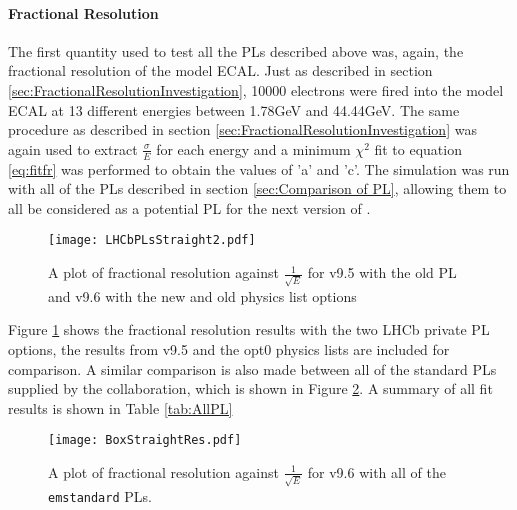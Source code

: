 \paragraph{Fractional Resolution}
The first quantity used to test all the PLs described above was, again, the fractional resolution of the model ECAL.  Just as described in section \ref{sec:FractionalResolutionInvestigation}, 10000 electrons were fired into the model ECAL at 13 different energies between 1.78GeV and 44.44GeV.  The same procedure as described in section \ref{sec:FractionalResolutionInvestigation} was again used to extract $\frac{\sigma}{E}$ for each energy and a minimum $\chi^2$ fit to equation \ref{eq:fitfr} was performed to obtain the values of 'a' and 'c'.  The simulation was run with all of the PLs described in section \ref{sec:Comparison of PL}, allowing them to all be considered as a potential PL for the next version of \gauss.
\begin{figure}[h]
  \centering
  \texttt{[image: LHCbPLsStraight2.pdf]}
  \caption{A plot of fractional resolution against $\frac{1}{\sqrt{E}}$ for \geant v9.5 with the old PL and v9.6 with the new and old physics list options}
  \label{fig:LHCbPLStraightFR}
\end{figure}

Figure \ref{fig:LHCbPLStraightFR} shows the fractional resolution results with the two LHCb private PL options, the results from v9.5 and the opt0 physics lists are included for comparison. A similar comparison is also made between all of the standard PLs supplied by the \geant collaboration, which is shown in Figure \ref{fig:BoxPLStraightFR}.  A summary of all fit results is shown in Table \ref{tab:AllPL}
\begin{figure}[h]
  \centering
  \texttt{[image: BoxStraightRes.pdf]}
  \caption{A plot of fractional resolution against $\frac{1}{\sqrt{E}}$ for \geant v9.6 with all of the \texttt{emstandard} PLs.}
  \label{fig:BoxPLStraightFR}
\end{figure}

